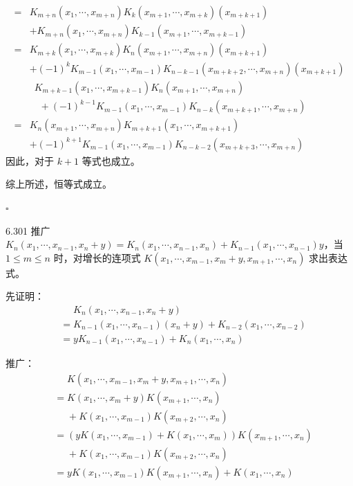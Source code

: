 \begin{enumerate}
\begin{align*}
      =& K_{m+n}(x_1, \cdots, x_{m+n}) K_{k}(x_{m+1}, \cdots, x_{m+k})  (x_{m+k+1}) \\
      & + K_{m+n}(x_1, \cdots, x_{m+n}) K_{k-1} (x_{m+1}, \cdots, x_{m+k-1}) \\
      =& K_{m+k}(x_1, \cdots, x_{m+k}) K_n(x_{m+1}, \cdots, x_{m+n}) (x_{m+k+1}) \\
      & + (-1)^k K_{m-1}(x_1, \cdots, x_{m-1}) K_{n-k-1}(x_{m+k+2}, \cdots, x_{m+n}) (x_{m+k+1}) \\
      & \phantom{1} K_{m+k-1} (x_1, \cdots, x_{m+k-1}) K_n(x_{m+1}, \cdots, x_{m+n}) \\
      & \phantom{11} + (-1)^{k-1} K_{m-1} (x_1, \cdots, x_{m-1}) K_{n-k} (x_{m+k+1}, \cdots, x_{m+n}) \\
      =& K_n(x_{m+1}, \cdots, x_{m+n}) K_{m+k+1}(x_1, \cdots, x_{m+k+1}) \\
      &+ (-1)^{k+1} K_{m-1} (x_1, \cdots, x_{m-1}) K_{n-k-2}(x_{m+k+3}, \cdots, x_{m+n})
    \end{align*}
    因此，对于 \( k+1 \) 等式也成立。
\end{enumerate}

综上所述，恒等式成立。

\hfill \( \square \)

\begin{problem}{6.30}{1}
  推广 \( K_n(x_1, \cdots, x_{n-1}, x_n+y) = K_n(x_1, \cdots, x_{n-1}, x_n) + K_{n-1}(x_1, \cdots, x_{n-1})y \)，当 \( 1 \leqslant m \leqslant n \) 时，对增长的连项式 \( K(x_1, \cdots, x_{m-1}, x_m+y, x_{m+1}, \cdots, x_n) \) 求出表达式。
\end{problem}

先证明：
\begin{align*}
  &\phantom{=} K_n(x_1, \cdots, x_{n-1}, x_n + y) \\
  &= K_{n-1}(x_1, \cdots, x_{n-1}) (x_n + y) + K_{n-2} (x_1, \cdots, x_{n-2}) \\
  &= y K_{n-1} (x_1, \cdots, x_{n-1}) + K_n (x_1, \cdots, x_n)
\end{align*}

推广：
\begin{align*}
  &\phantom{=} K(x_1, \cdots, x_{m-1}, x_m+y, x_{m+1}, \cdots, x_n) \\
  &= K(x_1, \cdots, x_m+y) K(x_{m+1}, \cdots, x_n) \\
  &\phantom{=} + K(x_1, \cdots, x_{m-1}) K(x_{m+2}, \cdots, x_n) \\
  &= (y K(x_1, \cdots, x_{m-1}) + K(x_1, \cdots, x_m)) K(x_{m+1}, \cdots, x_n) \\
  &\phantom{=} + K(x_1, \cdots, x_{m-1}) K(x_{m+2}, \cdots, x_n) \\
  &= yK(x_1, \cdots, x_{m-1}) K(x_{m+1}, \cdots, x_n) + K(x_1, \cdots, x_n)
\end{align*}

